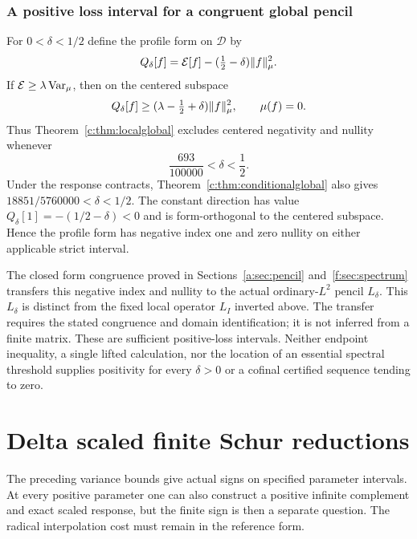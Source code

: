\documentclass[11pt,a4paper]{article}
\numberwithin{equation}{section}
\theoremstyle{definition}\newtheorem{definition}[theorem]{Definition}
\theoremstyle{remark}\newtheorem{remark}[theorem]{Remark}
\newcommand{\E}{\mathcal E}\newcommand{\D}{\mathcal D}
\begin{document}
\subsubsection{A positive loss interval for a congruent global pencil}
For $0<\delta<1/2$ define the profile form on $\D$ by
\[
 Q_\delta[f]=\E[f]-(\tfrac12-\delta)\norm f_\mu^2.
\]
If $\E\ge\lambda\Var_\mu$, then on the centered subspace
\[
 Q_\delta[f]\ge(\lambda-\tfrac12+\delta)\lVert f\rVert_\mu^2,
 \qquad\mu(f)=0.
\]
Thus Theorem~\ref{c:thm:localglobal} excludes centered negativity and nullity whenever
\begin{equation}\label{c:eq:pencilinterval}
 \frac{693}{100000}<\delta<\frac12.
\end{equation}
Under the response contracts, Theorem~\ref{c:thm:conditionalglobal} also gives
$18851/5760000<\delta<1/2$.
The constant direction has value $Q_\delta[1]=-(1/2-\delta)<0$ and is form-orthogonal to the centered subspace. Hence the profile form has negative index one and zero nullity on either applicable strict interval.

The closed form congruence proved in Sections~\ref{a:sec:pencil} and~\ref{f:sec:spectrum} transfers this negative index and nullity to the actual ordinary-$L^2$ pencil $L_\delta$.
This $L_\delta$ is distinct from the fixed local operator $L_I$ inverted above.
The transfer requires the stated congruence and domain identification; it is not inferred from a finite matrix.
These are sufficient positive-loss intervals. Neither endpoint inequality, a single lifted calculation, nor the location of an essential spectral threshold supplies positivity for every $\delta>0$ or a cofinal certified sequence tending to zero.


\section{Delta scaled finite Schur reductions}\label{sec:schur-unified}
The preceding variance bounds give actual signs on specified parameter intervals. At every positive parameter one can also construct a positive infinite complement and exact scaled response, but the finite sign is then a separate question. The radical interpolation cost must remain in the reference form.
\end{document}
